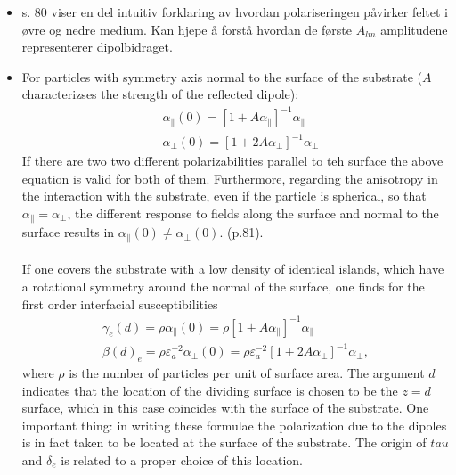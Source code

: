 \begin{itemize}
\item s. 80 viser en del intuitiv forklaring av hvordan polariseringen påvirker feltet i øvre og nedre
medium. Kan hjepe å forstå hvordan de første $A_{lm}$ amplitudene representerer dipolbidraget.
\item For particles with symmetry axis normal to the surface of the substrate ($A$ characterizses the strength
of the reflected dipole):
\begin{align}
&\alpha_{\parallel}(0) = [1 + A \alpha_{\parallel}]^{-1} \alpha_{\parallel} \\
&\alpha_{\perp}(0) = [1 + 2 A \alpha_{\perp}]^{-1} \alpha_{\perp}
\end{align}
If there are two two different polarizabilities parallel to teh surface the above equation is valid for 
both of them. Furthermore, regarding the anisotropy in the interaction with the substrate, even
if the particle is spherical, so that $\alpha_{\parallel} = \alpha_{\perp}$, the different response
to fields along the surface and normal to the surface results in $\alpha_{\parallel}(0) \neq \alpha_{\perp}(0)$.
(p.81).
\\
\\
If one covers the substrate with a low density of identical islands, which have a rotational symmetry
around the normal of the surface, one finds for the first order interfacial susceptibilities
\begin{align}
\gamma_e(d) = \rho \alpha_{\parallel}(0) = \rho[1 + A \alpha_{\parallel}]^{-1} \alpha_{\parallel}\\
\beta(d)_e = \rho \varepsilon_a^{-2}\alpha_{\perp}(0) = \rho \varepsilon_a^{-2}[1 + 2 A \alpha_{\perp}]^{-1} \alpha_{\perp},
\end{align}
where $\rho$ is the number of particles per unit of surface area. The argument $d$ indicates
that the location of the dividing surface is chosen to be the $z=d$ surface, which in this case
coincides with the surface of the substrate. One important thing: in writing these formulae the polarization
due to the dipoles is in fact taken to be located at the surface of the substrate. The origin of $tau$ and
$\delta_e$ is related to a proper choice of this location.


\end{itemize}
